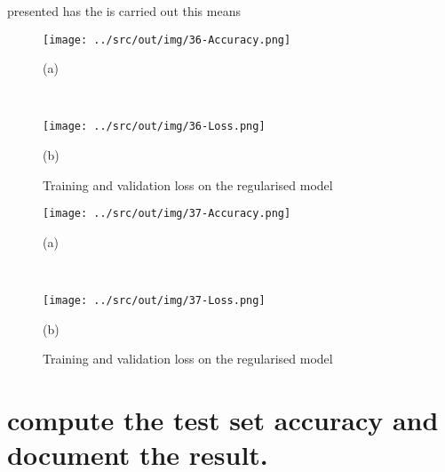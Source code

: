 \documentclass[a4paper,12pt]{article} %
\begin{document}
		presented has  the  
		is carried out 
		this means 
	\begin{figure}[htb]
		\begin{minipage}[c]{.49\textwidth}
			\centering
			\texttt{[image: ../src/out/img/36-Accuracy.png]}
			\caption*{(a)}
		\end{minipage}
		~
		\begin{minipage}[c]{.49\textwidth}
			\centering
			\texttt{[image: ../src/out/img/36-Loss.png]}
			\caption*{(b)}
		\end{minipage}
		\caption{Training and validation loss on the regularised model}
		\label{fig:model8-performance}
	\end{figure}
	
		
	\begin{figure}[htb]
		\begin{minipage}[c]{.49\textwidth}
			\centering
			\texttt{[image: ../src/out/img/37-Accuracy.png]}
			\caption*{(a)}
		\end{minipage}
		~
		\begin{minipage}[c]{.49\textwidth}
			\centering
			\texttt{[image: ../src/out/img/37-Loss.png]}
			\caption*{(b)}
		\end{minipage}
		\caption{Training and validation loss on the regularised model}
		\label{fig:model9-performance}
	\end{figure}


	\section{compute the test set accuracy and document the result.} 
	\label{section:finalmodel}
\end{document}
